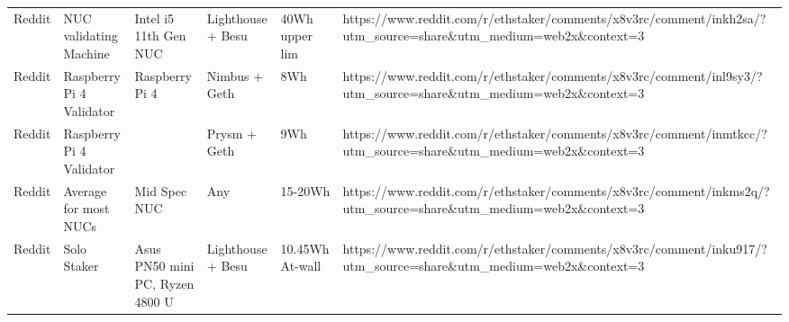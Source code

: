 \begin{landscape}
\begin{table}[]
\begin{tabular}{@{}llllll@{}}
Reddit                                                                               & NUC validating Machine                                                            & Intel i5 11th Gen NUC                                                                      & Lighthouse + Besu                                                                    & 40Wh upper lim                                                                              & https://www.reddit.com/r/ethstaker/comments/x8v3rc/comment/inkh2sa/?utm\_source=share\&utm\_medium=web2x\&context=3 \\
Reddit                                                                               & Raspberry Pi 4 Validator                                                          & Raspberry Pi 4                                                                             & Nimbus + Geth                                                                        & 8Wh                                                                                         & https://www.reddit.com/r/ethstaker/comments/x8v3rc/comment/inl9sy3/?utm\_source=share\&utm\_medium=web2x\&context=3 \\
Reddit                                                                               & Raspberry Pi 4 Validator                                                          &                                                                                            & Prysm + Geth                                                                         & 9Wh                                                                                         & https://www.reddit.com/r/ethstaker/comments/x8v3rc/comment/inmtkcc/?utm\_source=share\&utm\_medium=web2x\&context=3 \\
Reddit                                                                               & Average for most NUCs                                                             & Mid Spec NUC                                                                               & Any                                                                                  & 15-20Wh                                                                                     & https://www.reddit.com/r/ethstaker/comments/x8v3rc/comment/inkms2q/?utm\_source=share\&utm\_medium=web2x\&context=3 \\
Reddit                                                                               & Solo Staker                                                                       & Asus PN50 mini PC, Ryzen 4800 U                                                            & Lighthouse + Besu                                                                    & 10.45Wh At-wall                                                                             & https://www.reddit.com/r/ethstaker/comments/x8v3rc/comment/inku917/?utm\_source=share\&utm\_medium=web2x\&context=3 \\

\end{tabular}
\end{table}
\end{landscape}
